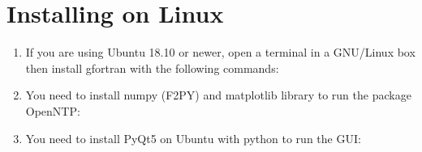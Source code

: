 \documentclass[letterpaper,10pt,english]{sphinxmanual}
\begin{document}
\section{Installing on Linux}
\label{\detokenize{Installation:installing-on-linux}}\begin{enumerate}
\def\theenumi{\arabic{enumi}}
\def\labelenumi{\theenumi .}
\makeatletter\def\p@enumii{\p@enumi \theenumi .}\makeatother
\item {} \begin{description}
\item[{If you are using Ubuntu 18.10 or newer, open a terminal in a GNU/Linux box then install gfortran with the following commands:}] \leavevmode
\begin{sphinxVerbatim}[commandchars=\\\{\}]
  
   
\end{sphinxVerbatim}

\end{description}

\item {} \begin{description}
\item[{You need to install numpy (F2PY) and matplotlib library to run the package OpenNTP:}] \leavevmode
\begin{sphinxVerbatim}[commandchars=\\\{\}]
   
   
   
\end{sphinxVerbatim}

\end{description}

\item {} \begin{description}
\item[{You need to install PyQt5 on Ubuntu with python to run the GUI:}] \leavevmode
\begin{sphinxVerbatim}[commandchars=\\\{\}]
   
   
   
   
\end{sphinxVerbatim}


\end{description}
\end{enumerate}
\end{document}

